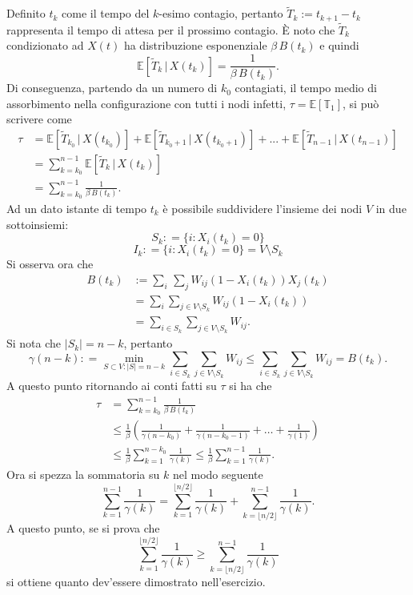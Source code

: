 \begin{alphaparts}
    \questionpart %
    
Definito $t_{k}$ come il tempo del $k$-esimo contagio, pertanto $\tilde{T}_{k} := t_{k+1} - t_{k}$ rappresenta il tempo di attesa per il prossimo contagio. È noto che $\tilde{T}_{k}$ condizionato ad $X(t)$ ha distribuzione esponenziale $\beta\,B(t_{k})$ e quindi
\[\mathbb{E} [ \tilde{T}_{k} \,\vert\, X(t_{k}) ] = \frac{1}{\beta\,B(t_{k})}.\]
Di conseguenza, partendo da un numero di $k_{0}$ contagiati, il tempo medio di assorbimento nella configurazione con tutti i nodi infetti, $\tau = \mathbb{E}[\mathbb{T}_{1}]$, si può scrivere come
\begin{align}
\tau &= \mathbb{E} [ \tilde{T}_{k_{0}} \,\vert\, X(t_{k_{0}}) ] +  \mathbb{E} [ \tilde{T}_{k_{0}+1} \,\vert\, X(t_{k_{0}+1}) ] + ... +  \mathbb{E} [ \tilde{T}_{n-1} \,\vert\, X(t_{n-1}) ] \nonumber\\
&= \sum_{k=k_{0}}^{n-1} \mathbb{E} [ \tilde{T}_{k} \,\vert\, X(t_{k}) ] \nonumber\\
&= \sum_{k=k_{0}}^{n-1} \frac{1}{\beta\,B(t_{k})}.\nonumber
\end{align}
Ad un dato istante di tempo $t_{k}$ è possibile suddividere l'insieme dei nodi $V$ in due sottoinsiemi:
\[ S_{k} : = \{ i : X_{i}(t_{k}) = 0 \} \]
\[ I_{k} : = \{ i : X_{i}(t_{k}) = 0 \} = V\setminus S_{k} \]
Si osserva ora che 
\begin{align}
B(t_{k})  &:= \sum_{i} \,\sum_{j} W_{ij}(1-X_{i}(t_{k}))X_{j}(t_{k}) \nonumber\\
&= \sum_{i} \sum_{j\in V\setminus S_{k} } W_{ij}(1-X_{i}(t_{k}))\nonumber\\
&= \sum_{i\in S_{k}} \sum_{j\in V\setminus S_{k} } W_{ij}.\nonumber
\end{align}
Si nota che \(\vert S_{k} \vert = n-k\), pertanto
\[\gamma(n-k) : = \min_{S\subset V : \vert S \vert = n - k} \sum_{i\in S_{k}} \sum_{j\in V\setminus S_{k} } W_{ij} \le \sum_{i\in S_{k}} \sum_{j\in V\setminus S_{k} } W_{ij} = B(t_{k}). \]
A questo punto ritornando ai conti fatti su $\tau$ si ha che
\begin{align}
\tau &=\sum_{k=k_{0}}^{n-1} \frac{1}{\beta\,B(t_{k})}\nonumber\\
& \le \frac{1}{\beta}\left(\frac{1}{\gamma(n-k_{0})}+\frac{1}{\gamma(n-k_{0}-1)}+ \dots +\frac{1}{\gamma(1)}\right)\nonumber\\
& \le \frac{1}{\beta} \sum_{k = 1}^{n-k_{0}} \frac{1}{\gamma(k)} \le \frac{1}{\beta} \sum_{k = 1}^{n-1} \frac{1}{\gamma(k)}.\nonumber
\end{align}
Ora si spezza la sommatoria su $k$ nel modo seguente
\[ \sum_{k = 1}^{n-1} \frac{1}{\gamma(k)} = \sum_{k = 1}^{\lfloor n/2\rfloor} \frac{1}{\gamma(k)} + \sum_{k = \lfloor n/2\rfloor}^{n-1} \frac{1}{\gamma(k)}.\]
A questo punto, se si prova che 
\[\sum_{k = 1}^{\lfloor n/2\rfloor} \frac{1}{\gamma(k)} \ge \sum_{k = \lfloor n/2\rfloor}^{n-1} \frac{1}{\gamma(k)} \]
si ottiene quanto dev'essere dimostrato nell'esercizio.


\end{alphaparts}
